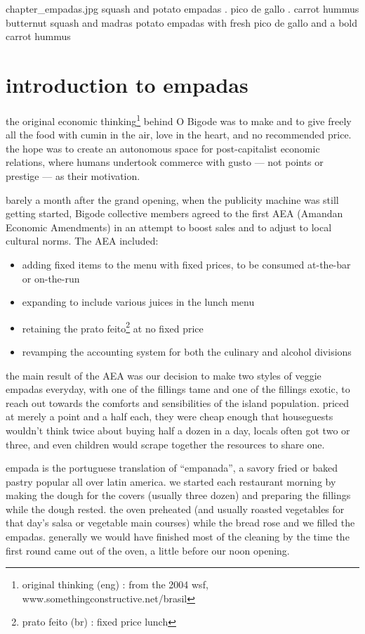\mychapter
{chapter_empadas.jpg}
{squash and potato empadas . pico de gallo . carrot hummus}
{butternut squash and madras potato empadas with fresh pico de gallo
and a bold carrot hummus}

\section{introduction to empadas}

the original economic thinking\footnote{original thinking (eng) : from
the 2004 wsf, www.somethingconstructive.net/brasil} behind O Bigode
was to make and to give freely all the food with cumin in the air,
love in the heart, and no recommended price. the hope was to create an
autonomous space for post-capitalist economic relations, where humans
undertook commerce with gusto --- not points or prestige --- as their
motivation.

barely a month after the grand opening, when the publicity machine was
still getting started, Bigode collective members agreed to the first
AEA (Amandan Economic Amendments) in an attempt to boost sales and to
adjust to local cultural norms. The AEA included:

\begin{itemize}
  \item adding fixed items to the menu with fixed prices, to be
  consumed at-the-bar or on-the-run

  \item expanding to include various juices in the lunch menu

  \item retaining the prato feito\footnote{prato feito (br) : fixed
  price lunch} at no fixed price

  \item revamping the accounting system for both the culinary and
  alcohol divisions
\end{itemize}

the main result of the AEA was our decision to make two styles of
veggie empadas everyday, with one of the fillings tame and one of the
fillings exotic, to reach out towards the comforts and sensibilities
of the island population. priced at merely a point and a half each,
they were cheap enough that houseguests wouldn't think twice about
buying half a dozen in a day, locals often got two or three, and even
children would scrape together the resources to share one.

empada is the portuguese translation of ``empanada'', a savory fried
or baked pastry popular all over latin america. we started each
restaurant morning by making the dough for the covers (usually three
dozen) and preparing the fillings while the dough rested. the oven
preheated (and usually roasted vegetables for that day's salsa or
vegetable main courses) while the bread rose and we filled the
empadas. generally we would have finished most of the cleaning by the
time the first round came out of the oven, a little before our noon
opening.

